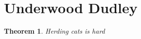 \documentclass{article}
\newtheorem{thm}{Theorem}
\begin{document}
{}

\section{Underwood Dudley}
\begin{thm}
  Herding cats is hard
\end{thm}
\end{document}
